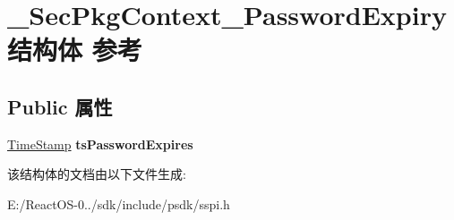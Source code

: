 \hypertarget{struct___sec_pkg_context___password_expiry}{}\section{\+\_\+\+Sec\+Pkg\+Context\+\_\+\+Password\+Expiry结构体 参考}
\label{struct___sec_pkg_context___password_expiry}
\subsection*{Public 属性}
\begin{DoxyCompactItemize}
\item 
\mbox{\label{struct___sec_pkg_context___password_expiry_a770557824e0e231877129b4d2b18c51e}} 
\hyperlink{struct___s_e_c_u_r_i_t_y___i_n_t_e_g_e_r}{Time\+Stamp} {\bfseries ts\+Password\+Expires}
\end{DoxyCompactItemize}


该结构体的文档由以下文件生成\+:\begin{DoxyCompactItemize}
\item 
E\+:/\+React\+O\+S-\/0../sdk/include/psdk/sspi.\+h\end{DoxyCompactItemize}

